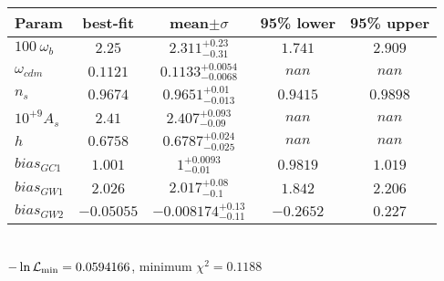 \begin{tabular}{|l|c|c|c|c|} 
 \hline 
Param & best-fit & mean$\pm\sigma$ & 95\% lower & 95\% upper \\ \hline 
$100~\omega_{b }$ &$2.25$ & $2.311_{-0.31}^{+0.23}$ & $1.741$ & $2.909$ \\ 
$\omega_{cdm }$ &$0.1121$ & $0.1133_{-0.0068}^{+0.0054}$ & $nan$ & $nan$ \\ 
$n_{s }$ &$0.9674$ & $0.9651_{-0.013}^{+0.01}$ & $0.9415$ & $0.9898$ \\ 
$10^{+9}A_{s }$ &$2.41$ & $2.407_{-0.09}^{+0.093}$ & $nan$ & $nan$ \\ 
$h$ &$0.6758$ & $0.6787_{-0.025}^{+0.024}$ & $nan$ & $nan$ \\ 
$bias_{GC 1 }$ &$1.001$ & $1_{-0.01}^{+0.0093}$ & $0.9819$ & $1.019$ \\ 
$bias_{GW 1 }$ &$2.026$ & $2.017_{-0.1}^{+0.08}$ & $1.842$ & $2.206$ \\ 
$bias_{GW 2 }$ &$-0.05055$ & $-0.008174_{-0.11}^{+0.13}$ & $-0.2652$ & $0.227$ \\ 
\hline 
 \end{tabular} \\ 
$-\ln{\cal L}_\mathrm{min} =0.0594166$, minimum $\chi^2=0.1188$ \\ 
